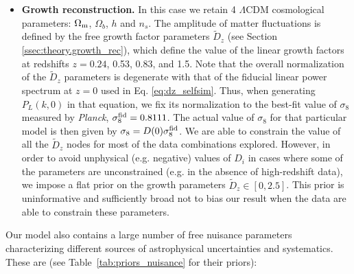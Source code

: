 \documentclass[a4paper,11pt]{article}
\newcommand{\Om}{\Omega_{\rm m}}
\newcommand{\lcdm}{$\Lambda$CDM\xspace}
\newcommand{\planck}{{\sl Planck}\xspace}
\begin{document}
\begin{itemize}
        \item {\bf Growth reconstruction.} In this case we retain 4 \lcdm cosmological parameters: $\Om$, $\Omega_b$, $h$ and $n_s$. The amplitude of matter fluctuations is defined by the free growth factor parameters $\tilde{D}_z$ (see Section \ref{ssec:theory.growth_rec}), which define the value of the linear growth factors at redshifts $z=0.24$, 0.53, 0.83, and 1.5. Note that the overall normalization of the $\tilde{D}_z$ parameters is degenerate with that of the fiducial linear power spectrum at $z=0$ used in Eq. \ref{eq:dz_selfsim}. Thus, when generating $P_L(k,0)$ in that equation, we fix its normalization to the best-fit value of $\sigma_8$ measured by \planck, $\sigma_8^{\rm fid}=0.8111$. The actual value of $\sigma_8$ for that particular model is then given by $\sigma_8=D(0)\sigma_8^{\rm fid}$. We are able to constrain the value of all the $\tilde{D}_z$ nodes for most of the data combinations explored. However, in order to avoid unphysical (e.g. negative) values of $D_i$ in cases where some of the parameters are unconstrained (e.g. in the absence of high-redshift data), we impose a flat prior on the growth parameters $\tilde{D}_z\in[0,2.5]$. This prior is uninformative and sufficiently broad not to bias our result when the data are able to constrain these parameters.
      \end{itemize}

      Our model also contains a large number of free nuisance parameters characterizing different sources of astrophysical uncertainties and systematics. These are (see Table~\ref{tab:priors_nuisance} for their priors):
      
\end{document}
